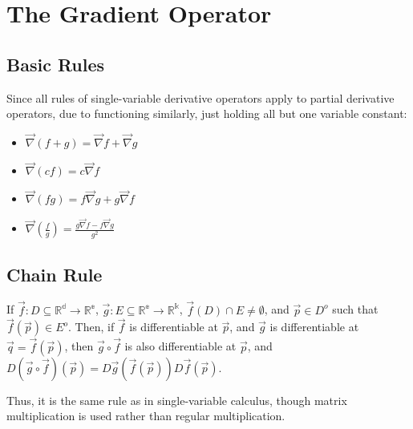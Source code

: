 \documentclass[11 pt, twoside]{article}
\begin{document}
\section{The Gradient Operator}

\subsection{Basic Rules}

Since all rules of single-variable derivative operators apply to partial derivative operators, due to functioning similarly, just holding all but one variable constant:

\begin{itemize}
\item $\vec{\nabla}(f + g) = \vec{\nabla}f + \vec{\nabla}g$
\item $\vec{\nabla}(cf) = c\vec{\nabla}f$
\item $\vec{\nabla}(fg) = f\vec{\nabla}g + g\vec{\nabla}f$
\item $\vec{\nabla}(\frac{f}{g}) = \frac{g\vec{\nabla}f - f\vec{\nabla}g}{g^2}$
\end{itemize}

\subsection{Chain Rule}

If $\vec{f}: D \subseteq \mathbb{R^d} \to \mathbb{R^e}$, $\vec{g}: E \subseteq \mathbb{R^e} \to \mathbb{R^k}$, $\vec{f}(D) \cap E \neq \emptyset$, and $\vec{p} \in D^o$ such that $\vec{f}(\vec{p}) \in E^o$. Then, if $\vec{f}$ is differentiable at $\vec{p}$, and $\vec{g}$ is differentiable at $\vec{q} = \vec{f}(\vec{p})$, then $\vec{g} \circ \vec{f}$ is also differentiable at $\vec{p}$, and $D(\vec{g} \circ \vec{f})(\vec{p}) = D\vec{g}(\vec{f}(\vec{p}))D\vec{f}(\vec{p})$.

Thus, it is the same rule as in single-variable calculus, though matrix multiplication is used rather than regular multiplication.
\end{document}
